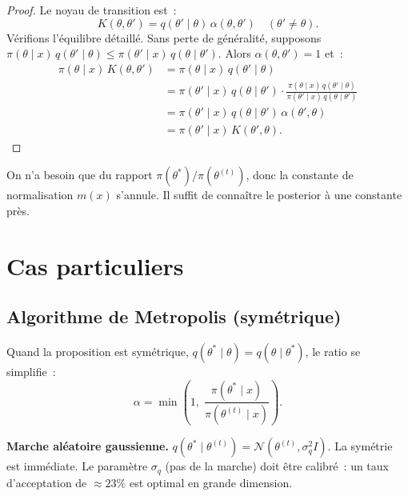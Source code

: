 \begin{proof}
Le noyau de transition est~:
\[
  K(\theta, \theta') = q(\theta' \mid \theta)\,\alpha(\theta, \theta')
  \quad (\theta' \neq \theta).
\]
V\'erifions l'\'equilibre d\'etaill\'e. Sans perte de g\'en\'eralit\'e,
supposons $\pi(\theta \mid x)\,q(\theta' \mid \theta) \leq
\pi(\theta' \mid x)\,q(\theta \mid \theta')$. Alors $\alpha(\theta, \theta') = 1$ et~:
\begin{align*}
  \pi(\theta \mid x)\,K(\theta, \theta')
  &= \pi(\theta \mid x)\,q(\theta' \mid \theta) \\
  &= \pi(\theta' \mid x)\,q(\theta \mid \theta')
  \cdot \frac{\pi(\theta \mid x)\,q(\theta' \mid \theta)}
             {\pi(\theta' \mid x)\,q(\theta \mid \theta')} \\
  &= \pi(\theta' \mid x)\,q(\theta \mid \theta')\,\alpha(\theta', \theta) \\
  &= \pi(\theta' \mid x)\,K(\theta', \theta).
\end{align*}
\end{proof}

\begin{remarque}
On n'a besoin que du rapport $\pi(\theta^*)/\pi(\theta^{(t)})$, donc
la constante de normalisation $m(x)$ s'annule. Il suffit de conna\^itre
le posterior \`a une constante pr\`es.
\end{remarque}

\section{Cas particuliers}

\subsection{Algorithme de Metropolis (sym\'etrique)}

\begin{definition}[Metropolis]
Quand la proposition est sym\'etrique, $q(\theta^* \mid \theta) = q(\theta \mid \theta^*)$,
le ratio se simplifie~:
\[
  \alpha = \min\!\left(1,\; \frac{\pi(\theta^* \mid x)}{\pi(\theta^{(t)} \mid x)}\right).
\]
\end{definition}

\begin{exemple}
\textbf{Marche al\'eatoire gaussienne.}
$q(\theta^* \mid \theta^{(t)}) = \mathcal{N}(\theta^{(t)}, \sigma_q^2 I)$.
La sym\'etrie est imm\'ediate. Le param\`etre $\sigma_q$ (pas de la
marche) doit \^etre calibr\'e~: un taux d'acceptation de $\approx 23\%$
est optimal en grande dimension.
\end{exemple}

